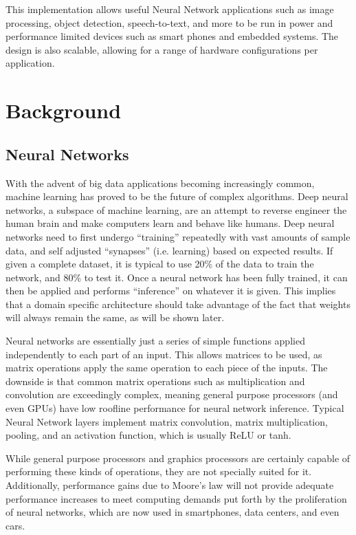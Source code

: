 \documentclass[11pt, conference, onecolumn]{IEEEtran}
\begin{document}
    This implementation allows useful Neural Network applications such as image processing,
    object detection, speech-to-text, and more to be run in power and performance limited
    devices such as smart phones and embedded systems. The design is also scalable,
    allowing for a range of hardware configurations per application.
\section{Background}

\subsection{Neural Networks}
    With the advent of big data applications becoming increasingly common, machine learning
    has proved to be the future of complex algorithms. Deep neural networks, a subspace of
    machine learning, are an attempt to reverse engineer the human brain and make computers
    learn and behave like humans. Deep neural networks need to first undergo “training”
    repeatedly with vast amounts of sample data, and self adjusted “synapses”
    (i.e. learning) based on expected results. If given a complete dataset, it is typical
    to use 20\% of the data to train the network, and 80\% to test it. Once a neural
    network has been fully trained, it can then be applied and performs  “inference” on
    whatever it is given. This implies that a domain specific architecture should take
    advantage of the fact that weights will always remain the same, as will be shown later.

    Neural networks are essentially just a series of simple functions applied independently
    to each part of an input. This allows matrices to be used, as matrix operations apply
    the same operation to each piece of the inputs. The downside is that common matrix
    operations such as multiplication and convolution are exceedingly complex, meaning
    general purpose processors (and even GPUs) have low roofline performance for
    neural network inference. Typical Neural Network layers implement matrix convolution,
    matrix multiplication, pooling, and an activation function, which is usually ReLU or
    tanh.

    While general purpose processors and graphics processors are certainly capable of
    performing these kinds of operations, they are not specially suited for it.
    Additionally, performance gains due to Moore's law will not provide adequate
    performance increases to meet computing demands put forth by the proliferation of
    neural networks, which are now used in smartphones, data centers, and even cars.
\end{document}
